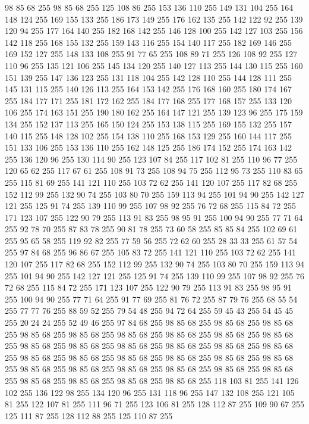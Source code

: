 98 85 68 255 98 85 68 255 125 108 86 255 153 136 110 255 149 131 104 255 164 148 124 255 169 155 133 255 186 173 149 255 176 162 135 255 142 122 92 255 139 120 94 255 177 164 140 255 182 168 142 255 146 128 100 255 142 127 103 255 156 142 118 255 168 155 132 255 159 143 116 255 154 140 117 255 182 169 146 255 169 152 127 255 148 133 108 255 91 77 65 255 108 89 71 255 126 108 92 255 127 110 96 255 135 121 106 255 145 134 120 255 140 127 113 255 144 130 115 255 160 151 139 255 147 136 123 255 131 118 104 255 142 128 110 255 144 128 111 255 145 131 115 255 140 126 113 255 164 153 142 255 176 168 160 255 180 174 167 255 184 177 171 255 181 172 162 255 184 177 168 255 177 168 157 255 133 120 106 255 174 163 151 255 190 180 162 255 164 147 121 255 139 123 96 255 175 159 134 255 152 137 113 255 165 150 124 255 153 138 115 255 169 155 132 255 157 140 115 255 148 128 102 255 154 138 110 255 168 153 129 255 160 144 117 255 151 133 106 255 153 136 110 255 162 148 125 255 186 174 152 255 174 163 142 255
136 120 96 255 130 114 90 255 123 107 84 255 117 102 81 255 110 96 77 255 120 65 62 255 117 67 61 255 108 91 73 255 108 94 75 255 112 95 73 255 110 83 65 255 115 81 69 255 141 121 110 255 103 72 62 255 141 120 107 255 117 82 68 255 152 112 99 255 132 90 74 255 103 80 70 255 159 113 94 255 101 94 90 255 142 127 121 255 125 91 74 255 139 110 99 255 107 98 92 255 76 72 68 255 115 84 72 255 171 123 107 255 122 90 79 255 113 91 83 255 98 95 91 255 100 94 90 255 77 71 64 255 92 78 70 255 87 83 78 255 90 81 78 255 73 60 58 255 85 85 84 255 102 69 61 255 95 65 58 255 119 92 82 255 77 59 56 255 72 62 60 255 28 33 33 255 61 57 54 255 97 84 68 255 96 86 67 255 105 83 72 255 141 121 110 255 103 72 62 255 141 120 107 255 117 82 68 255 152 112 99 255 132 90 74 255 103 80 70 255 159 113 94 255 101 94 90 255 142 127 121 255 125 91 74 255 139 110 99 255 107 98 92 255 76 72 68 255 115 84 72 255 171 123 107 255
122 90 79 255 113 91 83 255 98 95 91 255 100 94 90 255 77 71 64 255 91 77 69 255 81 76 72 255 87 79 76 255 68 55 54 255 77 77 76 255 88 59 52 255 79 54 48 255 94 72 64 255 59 45 43 255 54 45 45 255 20 24 24 255 52 49 46 255 97 84 68 255 98 85 68 255 98 85 68 255 98 85 68 255 98 85 68 255 98 85 68 255 98 85 68 255 98 85 68 255 98 85 68 255 98 85 68 255 98 85 68 255 98 85 68 255 98 85 68 255 98 85 68 255 98 85 68 255 98 85 68 255 98 85 68 255 98 85 68 255 98 85 68 255 98 85 68 255 98 85 68 255 98 85 68 255 98 85 68 255 98 85 68 255 98 85 68 255 98 85 68 255 98 85 68 255 98 85 68 255 98 85 68 255 98 85 68 255 98 85 68 255 98 85 68 255 118 103 81 255 141 126 102 255 136 122 98 255 134 120 96 255 131 118 96 255 147 132 108 255 121 105 81 255 122 107 81 255 111 96 71 255 123 106 81 255 128 112 87 255 109 90 67 255 125 111 87 255 128 112 88 255 125 110 87 255
